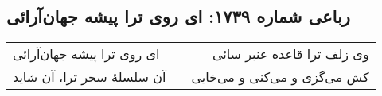 \begin{center}
\section*{رباعی شماره ۱۷۳۹: ای روی ترا پیشه جهان‌آرائی}
\label{sec:1739}
\begin{longtable}{l p{0.5cm} r}
ای روی ترا پیشه جهان‌آرائی
&&
وی زلف ترا قاعده عنبر سائی
\\
آن سلسلهٔ سحر ترا، آن شاید
&&
کش می‌گزی و می‌کنی و می‌خایی
\\
\end{longtable}
\end{center}
